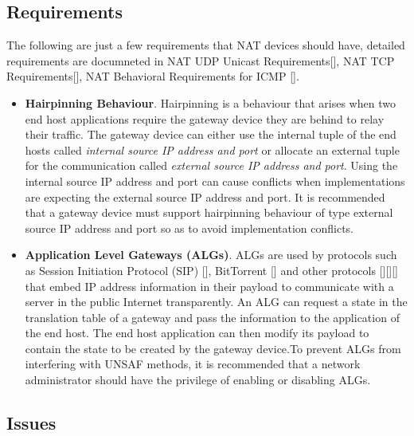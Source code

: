 \documentclass[iwp,first]{luthesis}
\begin{document}
\subsection{Requirements}

The following are just a few requirements that NAT devices should have, detailed requirements are documneted in NAT UDP Unicast Requirements[], NAT TCP Requirements[], NAT Behavioral Requirements for ICMP [].

\begin{itemize}

\item {\bf Hairpinning Behaviour}. Hairpinning is a behaviour that arises when two end host applications require the gateway device they are behind to relay their traffic. The gateway device can either use the internal tuple of the end hosts called \emph{internal source IP address and port} or allocate an external tuple for the communication called \emph{external source IP address and port}. Using the internal source IP address and port can cause conflicts when implementations are expecting the external source IP address and port. It is recommended that a gateway device must support hairpinning behaviour of type external source IP address and port so as to avoid implementation conflicts.  


\item {\bf Application Level Gateways (ALGs)}. ALGs are used by protocols such as Session Initiation Protocol (SIP) [], BitTorrent [] and other  protocols [][][] that embed IP address information in their payload to communicate with a server in the public Internet transparently. An ALG can request a state in the translation table of a gateway and pass the information to the application of the end host. The end host application can then modify its payload to contain the state to be created by the gateway device.To prevent ALGs from interfering with UNSAF methods, it is recommended that a network administrator should have the privilege of enabling or disabling ALGs. 

\end{itemize}

\subsection{Issues}
\end{document}
